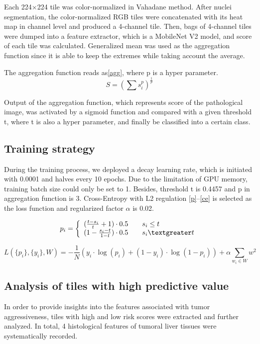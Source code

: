 \documentclass{article}
\begin{document}
Each 224$\times$224 tile was color-normalized in Vahadane method\cite{vahadane2016structure}. After nuclei segmentation, the color-normalized RGB tiles were concatenated with its heat map in channel level and produced a 4-channel tile. Then, bags of 4-channel tiles were dumped into a feature extractor, which is a MobileNet V2 model, and score of each tile was calculated. Generalized mean was used as the aggregation function since it is able to keep the extremes while taking account the average.

The aggregation function reads as\ref{agg}, where p is a hyper parameter.
\begin{equation}
	\label{agg}
	S = (\sum {s_{i}^{p}})^{\frac{1}{p}}
\end{equation}

Output of the aggregation function, which represents score of the pathological image, was activated by a sigmoid function and compared with a given threshold t, where t is also a hyper parameter, and finally be classified into a certain class.

\subsection{Training strategy}
During the training process, we deployed a decay learning rate, which is initiated with 0.0001 and halves every 10 epochs. Due to the limitation of GPU memory, training batch size could only be set to 1. Besides, threshold t is 0.4457 and p in aggregation function is 3. Cross-Entropy with L2 regulation \ref{p}--\ref{ce} is selected as the loss function and regularized factor $\alpha$ is 0.02.

\begin{equation}
	\label{p}
	p_i=\left\{
	\begin{array}{rcl}
		(\frac{t-s_i}{t}+1)\cdot 0.5 & & {s_i \leq t}\\
		(1-\frac{s_i-t}{1-t}) \cdot 0.5 & & {s_i \textgreater t}
	\end{array} \right.
\end{equation}

\begin{equation}
	\label{ce}
	L(\{p_i\}, \{y_i\}, W) = -\frac{1}{N}(y_i \cdot \log(p_i) + (1-y_i) \cdot \log(1-p_i)) + \alpha \sum_{w_i \in W} w^2
\end{equation}


\subsection{Analysis of tiles with high predictive value}
In order to provide insights into the features associated with tumor aggressiveness, tiles with high and low risk scores were extracted and further analyzed. In total, 4 histological features of tumoral liver tissues were systematically recorded.
\end{document}
